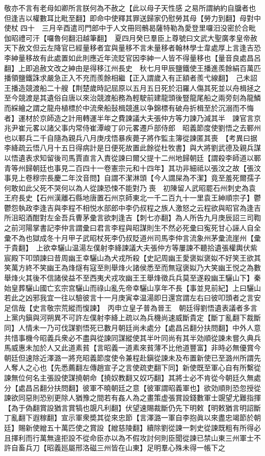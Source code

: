 敬亦不言有老母如卿所言朕何為不赦之【此以母子天性感之易所謂納約自牖者也但逢吉以權數耳比毗至翻】即命中使釋其罪送歸家仍慰勞其母【勞力到翻】母對中使杖四十　三月辛酉遣司門郎中于人文冊囘鶻曷薩特勒為愛登里囉汨没密於合毗伽昭禮可汗【囉魯何翻汨越筆翻】　夏四月癸巳羣臣上尊號曰文武大聖廣孝皇帝赦天下赦文但云左降官已經量移者宜與量移不言未量移者翰林學士韋處厚上言逢吉恐李紳量移故有此處置如此則應近年流貶官因李紳一人皆不得量移也【量音良處昌呂翻】上即追赦文改之紳由是得移江州長史　秋七月甲辰鹽鐵使王播進羨餘絹百萬匹播領鹽鐵誅求嚴急正入不充而羨餘相繼【正入謂歲入有正額者羨弋線翻】　己未詔王播造競渡船二十艘【荆楚歲時記屈原以五月五日死於汨羅人傷其死並以舟楫拯之至今競渡是其遺俗自唐以來治競渡船務為輕駛前建龍頭後豎龍尾船之兩旁刻為龍鱗而綵繪之謂之龍舟植標於中流衆船鼔楫競進以争錦標有破舟折楫至於沉溺而不悔者】運材於京師造之計用轉運半年之費諫議大夫張仲方等力諫乃減其半　諫官言京兆尹崔元畧以諸父事内常侍崔潭峻丁卯元畧遷戶部侍郎　昭義節度使劉悟之去鄆州也以鄆兵二千自隨為親兵八月庚戌悟暴疾薨子將作監主簿從諫匿其喪　【考異曰据李絳疏云悟八月十五日得病計是日便死故置此餘從杜牧書】與大將劉武德及親兵謀以悟遺表求知留後司馬賈直言入責從諫曰爾父提十二州地歸朝廷【謂殺李師道以鄆青等州歸朝廷也事見二百四十一卷憲宗元和十四年】其功非細祗以張汶之故【張汶事見上卷穆宗長慶二年汶音問】自謂不潔淋頭【今人謂屎為不潔】竟至羞死爾孺子何敢如此父死不哭何以為人從諫恐悚不能對乃喪　初陳留人武昭罷石州刺史為袁王府長史【石州漢離石縣地唐置石州京師東北一千二百九十一里袁王紳順宗子】鬱鬱怨執政李逢吉與李程不相悦水部郎中李仍叔程之族人激怒之云程欲與昭官為逢吉所沮昭酒酣對左金吾兵曹茅彚言欲刺逢吉【刺七亦翻】為人所告九月庚辰詔三司鞫之前河陽掌書記李仲言謂彚曰君言李程與昭謀則生不然必死彚曰寃死甘心誣人自全彚不為也獄成冬十月甲子武昭杖死李仍叔貶道州司馬李仲言流象州茅彚流崖州【彚于貴翻】　上欲幸驪山温湯左僕射李絳諫議大夫張仲方等屢諫不聽拾遺張權輿伏紫宸殿下叩頭諫曰昔周幽王幸驪山為犬戎所殺【史記周幽王愛褒姒褒姒不好笑王欲其笑萬方終不笑幽王為烽燧有寇至則舉烽火諸侯悉至而無寇褒姒乃大笑幽王悦之為數舉烽火其後不信諸侯益不至西夷犬戎攻幽王王舉烽徵兵兵莫至遂殺幽王驪山下】秦始皇葬驪山國亡玄宗宫驪山而祿山亂先帝幸驪山享年不長【事並見前紀】上曰驪山若此之凶邪我宜一往以驗彼言十一月庚寅幸温湯即日還宫謂左右曰彼叩頭者之言安足信哉【史言敬宗荒縱而愎諫】　丙申立皇子普為晉王　朝廷得劉悟遺表議者多言上黨内鎭與河朔異不可許左僕射李絳上疏以為兵機尚速威斷貴定【斷丁亂翻下裁斷同】人情未一乃可伐謀劉悟死已數月朝廷尚未處分【處昌呂翻分扶問翻】中外人意共惜事機今昭義兵衆必不盡與從諫同謀縱使其半叶同尚有其半効順從諫未嘗久典兵馬威惠未加於人又此道素貧【言昭義一道素來貧薄不比他道豐富】非時必無優賞今朝廷但速除近澤潞一將充昭義節度使令兼程赴鎭從諫未及布置新使已至潞州所謂先人奪人之心也【先悉薦翻左傳趙宣子之言使疏吏翻下同】新使既至軍心自有所繫從諫無位何名主張設使謀撓朝命【撓奴教翻又奴巧翻】其將士必不肯從今朝廷久無處分【處昌呂翻分扶問翻】彼軍不曉朝廷之意【彼軍謂昭義軍也】欲効順則恐忽授從諫欲同惡則恐别更除人猶豫之間若有姦人為之畫策虚張賞設錢數軍士覬望尤難指揮【為于偽翻賞設猶言賞犒也覬凡利翻】伏望速賜裁斷仍先下明敕【明敕猶言明詔斷丁亂翻下遐稼翻】宣示軍衆奬其從來忠節【言澤潞一軍自李抱眞以來盡忠竭節於朝廷】賜新使繒五十萬匹使之賞設【繒慈陵翻】續除劉從諫一刺史從諫既粗有所得必且擇利而行萬無違拒設不從命臣亦以為不假攻討何則臣聞從諫已禁山東三州軍士不許自畜兵刀【昭義廵屬邢洛磁三州皆在山東】足明羣心殊未得一帳下之